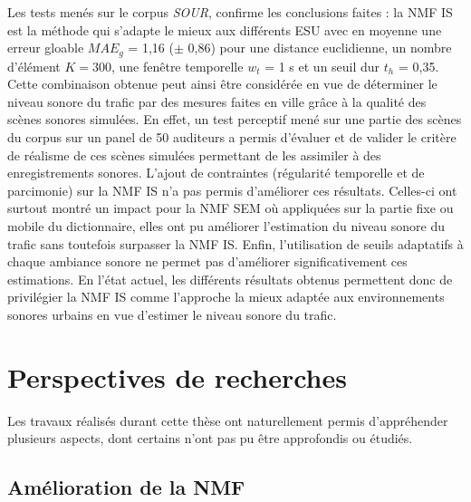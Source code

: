 Les tests menés sur le corpus \textit{SOUR}, confirme les conclusions faites : la NMF IS est la méthode qui s'adapte le mieux aux différents ESU avec en moyenne une erreur gloable $MAE_g$ = 1,16 ($\pm$ 0,86) pour une distance euclidienne, un nombre d'élément $K = 300$, une fenêtre temporelle $w_t$ = 1 s et un seuil dur $t_h$ = 0,35. Cette combinaison obtenue peut ainsi être considérée en vue de déterminer le niveau sonore du trafic par des mesures faites en ville grâce à la qualité des scènes sonores simulées. En effet, un test perceptif mené sur une partie des scènes du corpus sur un panel de 50 auditeurs a permis d'évaluer et de valider le critère de \og réalisme \fg{} de ces scènes simulées permettant de les assimiler à des enregistrements sonores.
L'ajout de contraintes (régularité temporelle et de parcimonie) sur la NMF IS n'a pas permis d'améliorer ces résultats. Celles-ci ont surtout montré un impact pour la NMF SEM où appliquées sur la partie fixe ou mobile du dictionnaire, elles ont pu améliorer l'estimation du niveau sonore du trafic sans toutefois surpasser la NMF IS. Enfin, l'utilisation de seuils adaptatifs à chaque ambiance sonore ne permet pas d'améliorer significativement ces estimations. 
En l'état actuel, les différents résultats obtenus permettent donc de privilégier la NMF IS comme l'approche la mieux adaptée aux environnements sonores urbains en vue d'estimer le niveau sonore du trafic. 


\section*{Perspectives de recherches}

Les travaux réalisés durant cette thèse ont naturellement permis d'appréhender plusieurs aspects, dont certains n'ont pas pu être approfondis ou étudiés.

\subsection*{Amélioration de la NMF}

